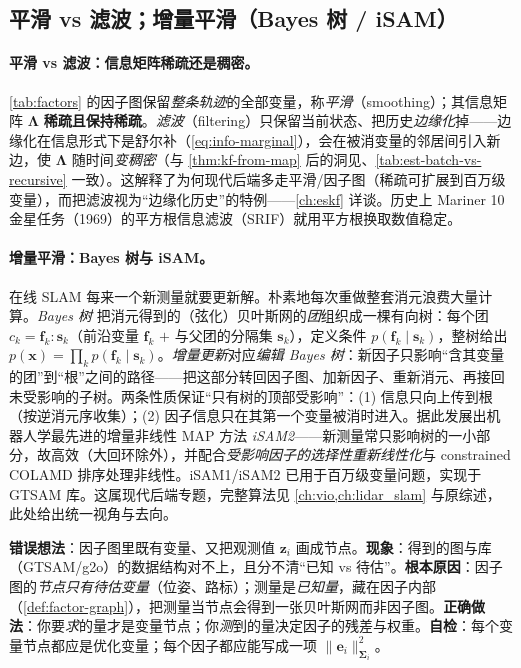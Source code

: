 \subsection{平滑 vs 滤波；增量平滑（Bayes 树 / iSAM）}
\label{sec:est-smooth-filter}

\paragraph{平滑 vs 滤波：信息矩阵稀疏还是稠密。}
\cref{tab:factors} 的因子图保留\emph{整条轨迹}的全部变量，称\emph{平滑}（smoothing）；其信息矩阵 $\boldsymbol{\Lambda}$ \textbf{稀疏且保持稀疏}。\emph{滤波}（filtering）只保留当前状态、把历史\emph{边缘化}掉——边缘化在信息形式下是舒尔补（\cref{eq:info-marginal}），会在被消变量的邻居间引入新边，使 $\boldsymbol{\Lambda}$ 随时间\emph{变稠密}\cite{carlone2026handbook}（与 \cref{thm:kf-from-map} 后的洞见、\cref{tab:est-batch-vs-recursive} 一致）。这解释了为何现代后端多走平滑/因子图（稀疏可扩展到百万级变量），而把滤波视为“边缘化历史”的特例——\cref{ch:eskf} 详谈。历史上 Mariner 10 金星任务（1969）的平方根信息滤波（SRIF）就用平方根换取数值稳定\cite{carlone2026handbook}。

\paragraph{增量平滑：Bayes 树与 iSAM。}
在线 SLAM 每来一个新测量就要更新解。朴素地每次重做整套消元浪费大量计算。\emph{Bayes 树}\cite{carlone2026handbook} 把消元得到的（弦化）贝叶斯网的\emph{团}组织成一棵有向树：每个团 $c_k=\mathbf{f}_k:\mathbf{s}_k$（前沿变量 $\mathbf{f}_k$ $+$ 与父团的分隔集 $\mathbf{s}_k$），定义条件 $p(\mathbf{f}_k\mid\mathbf{s}_k)$，整树给出 $p(\mathbf{x})=\prod_k p(\mathbf{f}_k\mid\mathbf{s}_k)$。\emph{增量更新}对应\emph{编辑 Bayes 树}：新因子只影响“含其变量的团”到“根”之间的路径——把这部分转回因子图、加新因子、重新消元、再接回未受影响的子树。两条性质保证“只有树的顶部受影响”：(1) 信息只向上传到根（按逆消元序收集）；(2) 因子信息只在其第一个变量被消时进入。据此发展出机器人学最先进的增量非线性 MAP 方法 \emph{iSAM2}\cite{carlone2026handbook}——新测量常只影响树的一小部分，故高效（大回环除外），并配合\emph{受影响因子的选择性重新线性化}与 constrained COLAMD 排序处理非线性。iSAM1/iSAM2 已用于百万级变量问题，实现于 GTSAM 库。这属现代后端专题，完整算法见 \cref{ch:vio,ch:lidar_slam} 与原综述\cite{dellaert2017factor}，此处给出统一视角与去向。

\begin{pitfall}
\textbf{错误想法}：因子图里既有变量、又把观测值 $\mathbf{z}_i$ 画成节点。\textbf{现象}：得到的图与库（GTSAM/g2o）的数据结构对不上，且分不清“已知 vs 待估”。\textbf{根本原因}：因子图的\emph{节点只有待估变量}（位姿、路标）；测量是\emph{已知量}，藏在因子内部（\cref{def:factor-graph}），把测量当节点会得到一张贝叶斯网而非因子图。\textbf{正确做法}：你要\emph{求}的量才是变量节点；你\emph{测}到的量决定因子的残差与权重。\textbf{自检}：每个变量节点都应是优化变量；每个因子都应能写成一项 $\|\mathbf{e}_i\|_{\boldsymbol{\Sigma}_i}^2$。
\end{pitfall}

